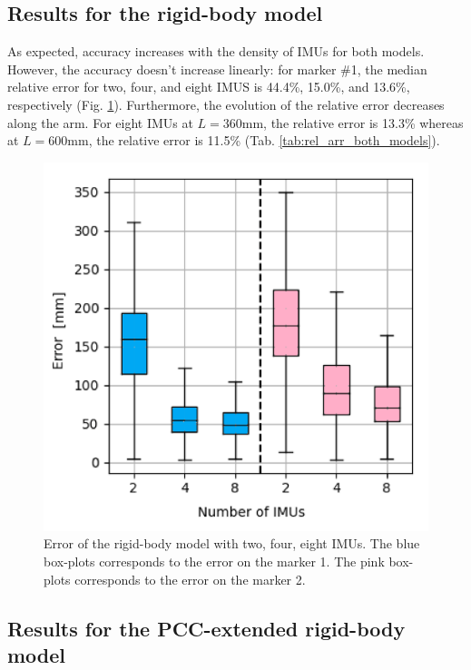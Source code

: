 \subsection{Results for the rigid-body model} 

As expected, accuracy increases with the density of IMUs for both models. 
However, the accuracy doesn't increase linearly: for marker \#1, the median relative error for two, four, and eight IMUS is 44.4\%, 15.0\%, and 13.6\%, respectively (Fig. \ref{fig:err_rigid_boy_model}). 
Furthermore, the evolution of the relative error decreases along the arm. For eight IMUs at $L=360$mm, the relative error is 13.3\% whereas at $L=600$mm, the relative error is 11.5\% (Tab. \ref{tab:rel_arr_both_models}).

\begin{figure}[ht!]
    \centering
    \includegraphics[width=\linewidth]{fig/error_RBM.png}
    \caption{Error of the rigid-body model with two, four, eight IMUs. The blue box-plots corresponds to the error on the marker 1. The pink box-plots corresponds to the error on the marker 2.}
    \label{fig:err_rigid_boy_model}
\end{figure}


\subsection{Results for the PCC-extended rigid-body model} 

